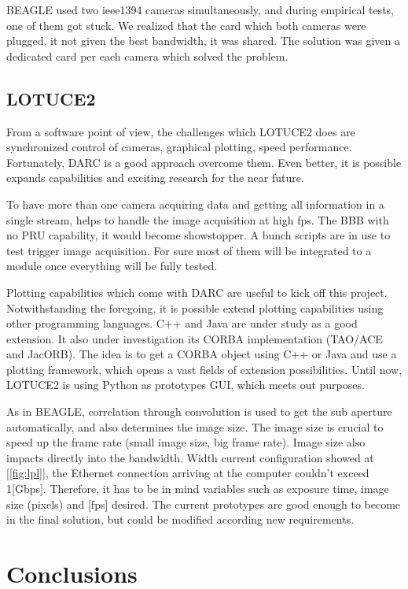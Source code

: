 \documentclass[]{spie}  %
\begin{document}
BEAGLE used two ieee1394 cameras simultaneously, and during empirical tests,
one of them got stuck. We realized that the card which both cameras were
plugged, it not given the best bandwidth, it was shared. The solution was given
a dedicated card per each camera which solved the problem.

\subsection{LOTUCE2}
From a software point of view, the challenges which LOTUCE2 does are
synchronized control of cameras, graphical plotting, speed performance.
Fortunately, DARC is a good approach overcome them. Even better, it is possible
expands capabilities and exciting research for the near future.

To have more than one camera acquiring data and getting all information in a
single stream, helps to handle the image acquisition at high fps. The BBB with
no PRU capability, it would become showstopper. A bunch scripts are in use to
test trigger image acquisition. For sure most of them will be integrated to a
module once everything will be fully tested. 

Plotting capabilities which come with DARC are useful to kick off this project.
Notwithstanding the foregoing, it is possible extend plotting capabilities
using other programming languages. C++ and Java are under study as a good
extension. It also under investigation its CORBA implementation (TAO/ACE and
JacORB). The idea is to get a CORBA object using C++ or Java and use a plotting
framework, which opens a vast fields of extension possibilities. Until now,
LOTUCE2 is using Python as prototypes GUI, which meets out purposes.

As in BEAGLE, correlation through convolution is used to get the sub aperture
automatically, and also determines the image size. The image size is crucial to
speed up the frame rate (small image size, big frame rate). Image size also
impacts directly into the bandwidth. Width current configuration showed at
[\ref{fig:lpl}], the Ethernet connection arriving at the computer couldn't
exceed 1[Gbps]. Therefore, it has to be in mind variables such as exposure
time, image size (pixels) and [fps] desired. The current prototypes are
good enough to become in the final solution, but could be modified according
new requirements.

\section{Conclusions}
\end{document}
